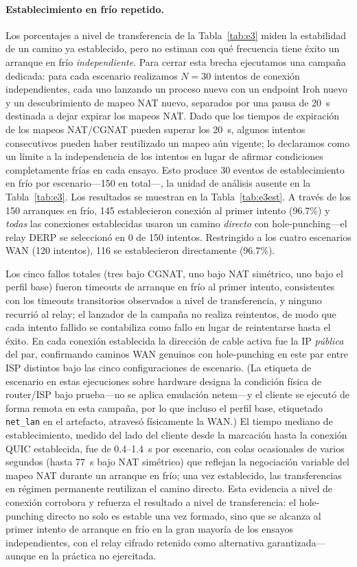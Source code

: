 \documentclass[journal]{IEEEtran}
\begin{document}
\paragraph{Establecimiento en frío repetido.}
Los porcentajes a nivel de transferencia de la Tabla~\ref{tab:e3} miden la estabilidad de un camino ya establecido, pero no estiman con qué frecuencia tiene éxito un arranque en frío \emph{independiente}. Para cerrar esta brecha ejecutamos una campaña dedicada: para cada escenario realizamos $N{=}30$ intentos de conexión independientes, cada uno lanzando un proceso nuevo con un endpoint Iroh nuevo y un descubrimiento de mapeo NAT nuevo, separados por una pausa de 20~s destinada a dejar expirar los mapeos NAT. Dado que los tiempos de expiración de los mapeos NAT/CGNAT pueden superar los 20~s, algunos intentos consecutivos pueden haber reutilizado un mapeo aún vigente; lo declaramos como un límite a la independencia de los intentos en lugar de afirmar condiciones completamente frías en cada ensayo. Esto produce 30 eventos de establecimiento en frío por escenario---150 en total---, la unidad de análisis ausente en la Tabla~\ref{tab:e3}. Los resultados se muestran en la Tabla~\ref{tab:e3est}. A través de los 150 arranques en frío, 145 establecieron conexión al primer intento (96.7\%) y \emph{todas} las conexiones establecidas usaron un camino \emph{directo} con hole-punching---el relay DERP se seleccionó en 0 de 150 intentos. Restringido a los cuatro escenarios WAN (120 intentos), 116 se establecieron directamente (96.7\%).

Los cinco fallos totales (tres bajo CGNAT, uno bajo NAT simétrico, uno bajo el perfil base) fueron timeouts de arranque en frío al primer intento, consistentes con los timeouts transitorios observados a nivel de transferencia, y ninguno recurrió al relay; el lanzador de la campaña no realiza reintentos, de modo que cada intento fallido se contabiliza como fallo en lugar de reintentarse hasta el éxito. En cada conexión establecida la dirección de cable activa fue la IP \emph{pública} del par, confirmando caminos WAN genuinos con hole-punching en este par entre ISP distintos bajo las cinco configuraciones de escenario. (La etiqueta de escenario en estas ejecuciones sobre hardware designa la condición física de router/ISP bajo prueba---no se aplica emulación netem---y el cliente se ejecutó de forma remota en esta campaña, por lo que incluso el perfil base, etiquetado \texttt{net\_lan} en el artefacto, atravesó físicamente la WAN.) El tiempo mediano de establecimiento, medido del lado del cliente desde la marcación hasta la conexión QUIC establecida, fue de 0.4--1.4~s por escenario, con colas ocasionales de varios segundos (hasta 77~s bajo NAT simétrico) que reflejan la negociación variable del mapeo NAT durante un arranque en frío; una vez establecido, las transferencias en régimen permanente reutilizan el camino directo. Esta evidencia a nivel de conexión corrobora y refuerza el resultado a nivel de transferencia: el hole-punching directo no solo es estable una vez formado, sino que se alcanza al primer intento de arranque en frío en la gran mayoría de los ensayos independientes, con el relay cifrado retenido como alternativa garantizada---aunque en la práctica no ejercitada.
\end{document}
